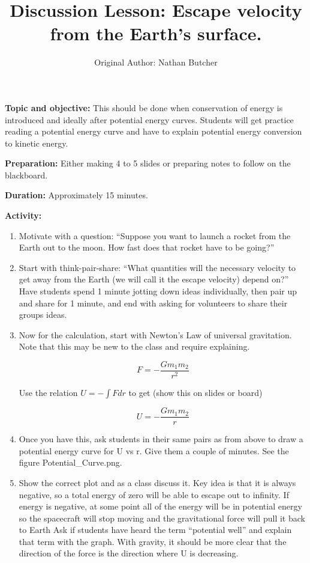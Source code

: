 \documentclass{article}
\title{Discussion Lesson: Escape velocity from the Earth's surface.}
\author{Original Author: Nathan Butcher}
\date{}
\begin{document}
\maketitle

\textbf{Topic and objective:} This should be done when conservation of energy is introduced and ideally after potential energy curves. Students will get practice reading a potential energy curve and have to explain potential energy conversion to kinetic energy.

\textbf{Preparation:} Either making 4 to 5 slides or preparing notes to follow on the blackboard. 

\textbf{Duration:} Approximately 15 minutes. 

\hspace{14pt}

\textbf{Activity:}
\begin{enumerate}
\item Motivate with a question: ``Suppose you want to launch a rocket from the Earth out to the moon. How fast does that rocket have to be going?''

\item Start with think-pair-share: ``What quantities will the necessary velocity to get away from the Earth (we will call it the escape velocity) depend on?'' Have students spend 1 minute jotting down ideas individually, then pair up and share for 1 minute, and end with asking for volunteers to share their groups ideas.

\item Now for the calculation, start with Newton's Law of universal gravitation. Note that this may be new to the class and require explaining.

\begin{equation}
F = - \frac{G m_1 m_2}{r^2}
\end{equation}

Use the relation $U = - \int F dr$ to get (show this on slides or board) 

\begin{equation}
U = - \frac{G m_1 m_2}{r}
\end{equation}

\item Once you have this, ask students in their same pairs as from above to draw a potential energy curve for U vs r. Give them a couple of minutes. See the figure Potential\_Curve.png.

\item Show the correct plot and as a class discuss it. Key idea is that it is always negative, so a total energy of zero will be able to escape out to infinity. If energy is negative, at some point all of the energy will be in potential energy so the spacecraft will stop moving and the gravitational force will pull it back to Earth Ask if students have heard the term ``potential well'' and explain that term with the graph. With gravity, it should be more clear that the direction of the force is the direction where U is decreasing.


\end{enumerate}
\end{document}

